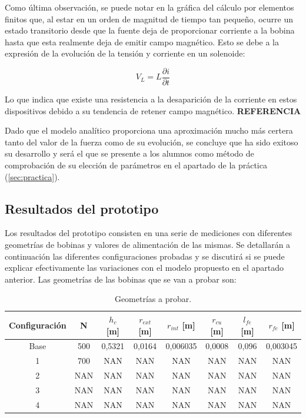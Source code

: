 Como última observación, se puede notar en la gráfica del cálculo por elementos finitos que, al estar en un orden de magnitud de tiempo tan pequeño, ocurre un estado transitorio desde que la fuente deja de proporcionar corriente a la bobina hasta que esta realmente deja de emitir campo magnético. Esto se debe a la expresión de la evolución de la tensión y corriente en un solenoide:

\[V_L=L\frac{\partial i}{\partial t}\]

Lo que indica que existe una resistencia a la desaparición de la corriente en estos dispositivos debido a su tendencia de retener campo magnético. \textbf{REFERENCIA}

Dado que el modelo analítico proporciona una aproximación mucho más certera tanto del valor de la fuerza como de su evolución, se concluye que ha sido exitoso su desarrollo y será el que se presente a los alumnos como método de comprobación de su elección de parámetros en el apartado de la práctica (\ref{sec:practica}).

\subsection{Resultados del prototipo}
\label{subsec:prototipoResults}

Los resultados del prototipo consisten en una serie de mediciones con diferentes geometrías de bobinas y valores de alimentación de las mismas. Se detallarán a continuación las diferentes configuraciones probadas y se discutirá si se puede explicar efectivamente las variaciones con el modelo propuesto en el apartado anterior. Las geometrías de las bobinas que se van a probar son:

\begin{table}[H]
    \centering
    \setlength{\tabcolsep}{5pt}
    \renewcommand{\arraystretch}{1.2}
    \begin{tabular}{|c|c|c|c|c|c|c|c|}
        \hline
        \textbf{Configuración} & \textbf{N} & \textbf{\(h_c\) [m]} & \textbf{\(r_{ext}\) [m]} & \textbf{\(r_{int}\) [m]} & \textbf{\(r_{cu}\) [m]} & \textbf{\(l_{fe}\) [m]} & \textbf{\(r_{fe}\) [m]} \\
        \hline
        Base & 500 & 0,5321 & 0,0164 & 0,006035 & 0,0008 & 0,096 & 0,003045 \\
        1 & 700 & NAN & NAN & NAN & NAN & NAN & NAN \\
        2 & NAN & NAN & NAN & NAN & NAN & NAN & NAN \\
        3 & NAN & NAN & NAN & NAN & NAN & NAN & NAN \\
        4 & NAN & NAN & NAN & NAN & NAN & NAN & NAN \\
        \hline
    \end{tabular}
    \caption{Geometrías a probar.}
    \label{tab:geometrias}
\end{table}

